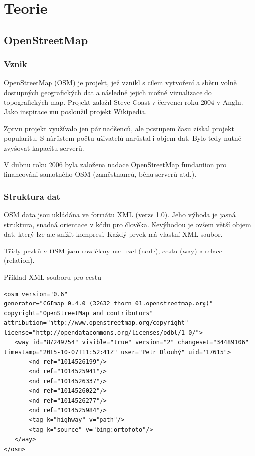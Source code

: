 \chapter{Teorie}
\label{2-Teorie}

\section{OpenStreetMap}
\label{OpenStreetMap}

\subsection{Vznik}
\label{vznik}
OpenStreetMap (OSM) je projekt, jež vznikl s cílem vytvoření a sběru 
volně dostupných geografických dat a následně jejich možné vizualizace
do topografických map. Projekt založil Steve Coast v červenci roku 
2004 v Anglii. Jako inspirace mu posloužil projekt Wikipedia.

Zprvu projekt využívalo jen pár nadšenců, ale postupem času získal 
projekt popularitu. S nárůstem počtu uživatelů narůstal i objem dat. 
Bylo tedy nutné zvyšovat kapacitu serverů. 

V dubnu roku 2006 byla založena nadace OpenStreetMap fundantion pro financováni 
samotného OSM (zaměstnanců, běhu serverů atd.). \cite{wikiOSM}


\subsection{Struktura dat}
\label{struktura dat}

OSM data jsou ukládána ve formátu XML (verze 1.0). Jeho výhoda je jasná 
struktura, snadná orientace v kódu pro člověka. Nevýhodou je ovšem větší objem 
dat, který lze ale snížit kompresí. Každý prvek má vlastní XML soubor. 

Třídy prvků v OSM jsou rozděleny na: uzel (node), cesta (way) a
relace (relation).

Příklad XML souboru pro cestu:

{\scriptsize
\begin{lstlisting}
<osm version="0.6" 
generator="CGImap 0.4.0 (32632 thorn-01.openstreetmap.org)" copyright="OpenStreetMap and contributors" attribution="http://www.openstreetmap.org/copyright" license="http://opendatacommons.org/licenses/odbl/1-0/">
   <way id="87249754" visible="true" version="2" changeset="34489106" timestamp="2015-10-07T11:52:41Z" user="Petr Dlouhý" uid="17615">
       <nd ref="1014526199"/>
       <nd ref="1014525941"/>
       <nd ref="1014526337"/>
       <nd ref="1014526022"/>
       <nd ref="1014526277"/>
       <nd ref="1014525984"/>
       <tag k="highway" v="path"/>
       <tag k="source" v="bing:ortofoto"/>
   </way>
</osm>
\end{lstlisting}
}


